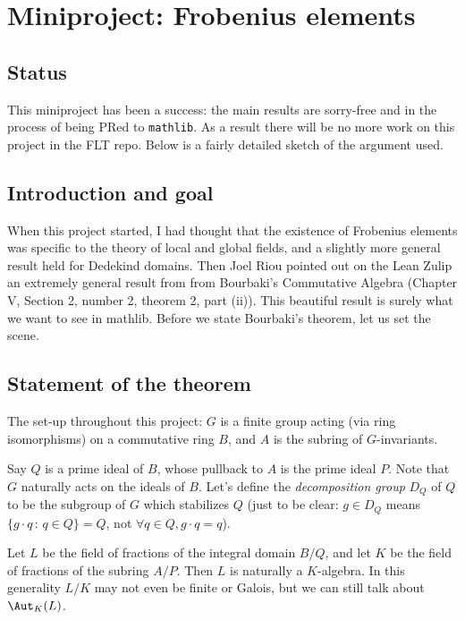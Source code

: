 \chapter{Miniproject: Frobenius elements}\label{Frobenius_project}

\section{Status}

This miniproject has been a success: the main results
are sorry-free and in the process of being PRed to
{\tt mathlib}. As a result there will be no more work
on this project in the FLT repo. Below is a fairly
detailed sketch of the argument used.

\section{Introduction and goal}

When this project started, I had thought that the existence of Frobenius elements was
specific to the theory of local and global fields, and a slightly more general result
held for Dedekind domains. Then Joel Riou pointed out on the Lean Zulip
an extremely general result from from Bourbaki's Commutative Algebra
(Chapter V, Section 2, number 2, theorem 2, part (ii)). This beautiful
result is surely what we want to see in mathlib. Before we state Bourbaki's
theorem, let us set the scene.

\section{Statement of the theorem}

The set-up throughout this project:
$G$ is a finite group acting (via ring isomorphisms) on a commutative ring $B$,
and $A$ is the subring of $G$-invariants.

Say $Q$ is a prime ideal of $B$, whose pullback to $A$ is the prime ideal $P$.
Note that $G$ naturally acts on the ideals of $B$. Let's define the
\emph{decomposition group} $D_Q$ of $Q$ to be the subgroup of $G$ which
stabilizes $Q$ (just to be clear: $g\in D_Q$ means
$\{g\cdot q\, :\, q \in Q\}=Q$, not $\forall q\in Q, g\cdot q=q$).

Let $L$ be the field of fractions of the integral domain $B/Q$, and let $K$ be the
field of fractions of the subring $A/P$. Then $L$ is naturally a $K$-algebra.
In this generality $L/K$ may not even be finite or Galois, but we can still talk about
$\Aut_K(L)$.

